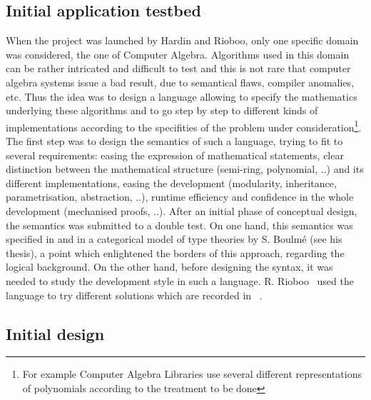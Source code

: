 \subsection*{Initial application testbed}

 When the {\foc} project was launched by Hardin and Rioboo,
only one specific domain was considered, the one of Computer
Algebra. Algorithms used in this domain can be rather intricated and
difficult to test and this is not rare that computer algebra systems
issue a bad result, due to semantical flaws, compiler anomalies,
etc. Thus the idea was to design a language allowing to specify the
mathematics underlying these algorithms and to go step by step to
different kinds of implementations according to the specifities of the
problem under consideration\footnote{For example Computer Algebra
Libraries use several different representations of polynomials
according to the treatment to be done}. The first step was to design
the semantics of such a language, trying to fit to several
requirements: easing the expression of mathematical statements, clear
distinction between the mathematical structure (semi-ring, polynomial,
..)  and its different implementations, easing the development
(modularity, inheritance, parametrisation, abstraction, ..), runtime
efficiency and confidence in the whole development (mechanised proofs,
..).  After an initial phase of conceptual design, the {\foc}
semantics was submitted to a double test. On one hand, this semantics
was specified in {\coq} and in a categorical model of type theories by
S. Boulm\'e (see his thesis\cite{BoulmePhD00}), a point which
enlightened the borders of this approach, regarding the logical
background. On the other hand, before designing the syntax, it was
needed to study the development style in such a
language. R. Rioboo~\cite{ThRRCalculemus,HardinRiobooTSI04} used the
{\ocaml} language to try different solutions which are recorded in
~\cite{HardinRiobooTSI04}.

\subsection*{Initial {\focal} design}

